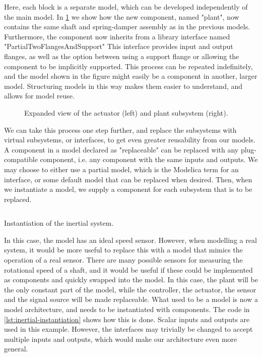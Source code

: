 \documentclass[\rootfolder/main.tex]{subfiles}
\begin{document}
Here, each block is a separate model, which can be developed independently of the main model.
In \cref{fig:inertial-architecture-blowup} we show how the new component, named "plant", now contains the same shaft and spring-damper assembly as in the previous models.
Furthermore, the component now inherits from a library interface named "PartialTwoFlangesAndSupport"
This interface provides input and output flanges, as well as the option between using a support flange or allowing the component to be implicitly supported.
This process can be repeated indefinitely, and the model shown in the figure might easily be a component in another, larger model.
Structuring models in this way makes them easier to understand, and allows for model reuse.

\begin{figure}[ht]
    \scriptsize
    \caption{Expanded view of the actuator (left) and plant subsystem (right).\label{fig:inertial-architecture-blowup}}
\end{figure}

We can take this process one step further, and replace the subsystems with virtual subsystems, or interfaces, to get even greater reusability from our models.
A component in a model declared as "replaceable" can be replaced with any plug-compatible component, i.e. any component with the same inputs and outputs.
We may choose to either use a partial model, which is the Modelica term for an interface, or some default model that can be replaced when desired.
Then, when we instantiate a model, we supply a component for each subsystem that is to be replaced.

\begin{listing}[ht]
    \inputminted[fontsize=\footnotesize]{Modelica}{\rootfolder/Models/MasterProject/Models/InertialImplementation.mo}
    \caption{Instantiation of the inertial system.\label{lst:inertial-instantiation}}
\end{listing}

In this case, the model has an ideal speed sensor. 
However, when modelling a real system, it would be more useful to replace this with a model that mimics the operation of a real sensor.
There are many possible sensors for measuring the rotational speed of a shaft, and it would be useful if these could be implemented as components and quickly swapped into the model.
In this case, the plant will be the only constant part of the model, while the controller, the actuator, the sensor and the signal source will be made replaceable.
What used to be a model is now a model architecture, and needs to be instantiated with components.
The code in \cref{lst:inertial-instantiation} shows how this is done.
Scalar inputs and outputs are used in this example.
However, the interfaces may trivially be changed to accept multiple inputs and outputs, which would make our architecture even more general.
\end{document}
